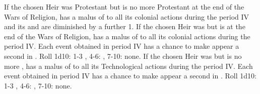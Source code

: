\bparag If the chosen Heir was Protestant but \FRA is no more Protestant at
the end of the Wars of Religion, \FRA has a malus of  to all its
colonial actions during the period IV and its \FTI and \DTI are diminished by
a further 1.
\bparag If the chosen Heir was \CATHCO but \FRA is \CATHCR at the end of the
Wars of Religion, \FRA has a malus of  to all its colonial actions
during the period IV.  Each event \RD obtained in period IV has a chance to
make appear a second \REVOLT \faceplus in \FRA. Roll 1d10: 1-3
\provincePoitou, 4-6: \provinceGuyenne, 7-10: none.
\bparag If the chosen Heir was \CATHCR but \FRA is no more \CATHCR, \FRA has a
malus of  to all its Technological actions during the period IV.
Each event \RD obtained in period IV has a chance to make appear a second
\REVOLT \faceplus in \FRA. Roll 1d10: 1-3 \provinceArmor, 4-6:
\provinceOrleanais, 7-10: none.


